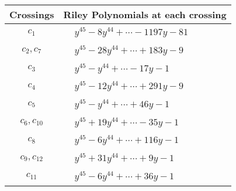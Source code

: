 \documentclass[1p]{elsarticle_modified}
\theoremstyle{definition}
\begin{document}
\begin{tabular}{m{50pt}|m{274pt}}
Crossings & \hspace{64pt}Riley Polynomials at each crossing \\
\hline $$\begin{aligned}c_{1}\end{aligned}$$&$\begin{aligned}
&y^{45}-8 y^{44}+\cdots-1197 y-81
\end{aligned}$\\
\hline $$\begin{aligned}c_{2},c_{7}\end{aligned}$$&$\begin{aligned}
&y^{45}-28 y^{44}+\cdots+183 y-9
\end{aligned}$\\
\hline $$\begin{aligned}c_{3}\end{aligned}$$&$\begin{aligned}
&y^{45}- y^{44}+\cdots-17 y-1
\end{aligned}$\\
\hline $$\begin{aligned}c_{4}\end{aligned}$$&$\begin{aligned}
&y^{45}-12 y^{44}+\cdots+291 y-9
\end{aligned}$\\
\hline $$\begin{aligned}c_{5}\end{aligned}$$&$\begin{aligned}
&y^{45}- y^{44}+\cdots+46 y-1
\end{aligned}$\\
\hline $$\begin{aligned}c_{6},c_{10}\end{aligned}$$&$\begin{aligned}
&y^{45}+19 y^{44}+\cdots-35 y-1
\end{aligned}$\\
\hline $$\begin{aligned}c_{8}\end{aligned}$$&$\begin{aligned}
&y^{45}-6 y^{44}+\cdots+116 y-1
\end{aligned}$\\
\hline $$\begin{aligned}c_{9},c_{12}\end{aligned}$$&$\begin{aligned}
&y^{45}+31 y^{44}+\cdots+9 y-1
\end{aligned}$\\
\hline $$\begin{aligned}c_{11}\end{aligned}$$&$\begin{aligned}
&y^{45}-6 y^{44}+\cdots+36 y-1
\end{aligned}$\\
\hline
\end{tabular}\\~\\
\end{document}
